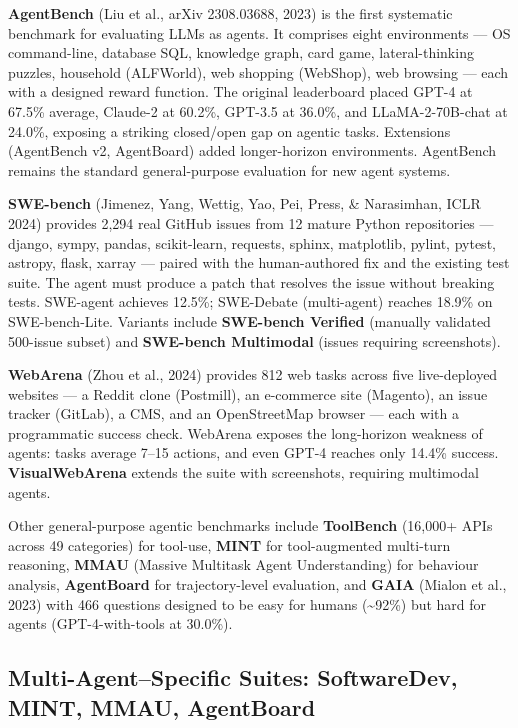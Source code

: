 \textbf{AgentBench} (Liu et al., arXiv 2308.03688, 2023) is the first systematic benchmark for evaluating LLMs as agents. It comprises eight environments --- OS command-line, database SQL, knowledge graph, card game, lateral-thinking puzzles, household (ALFWorld), web shopping (WebShop), web browsing --- each with a designed reward function. The original leaderboard placed GPT-4 at 67.5\% average, Claude-2 at 60.2\%, GPT-3.5 at 36.0\%, and LLaMA-2-70B-chat at 24.0\%, exposing a striking closed/open gap on agentic tasks. Extensions (AgentBench v2, AgentBoard) added longer-horizon environments. AgentBench remains the standard general-purpose evaluation for new agent systems.

\textbf{SWE-bench} (Jimenez, Yang, Wettig, Yao, Pei, Press, \& Narasimhan, ICLR 2024) provides 2,294 real GitHub issues from 12 mature Python repositories --- django, sympy, pandas, scikit-learn, requests, sphinx, matplotlib, pylint, pytest, astropy, flask, xarray --- paired with the human-authored fix and the existing test suite. The agent must produce a patch that resolves the issue without breaking tests. SWE-agent achieves 12.5\%; SWE-Debate (multi-agent) reaches 18.9\% on SWE-bench-Lite. Variants include \textbf{SWE-bench Verified} (manually validated 500-issue subset) and \textbf{SWE-bench Multimodal} (issues requiring screenshots).

\textbf{WebArena} (Zhou et al., 2024) provides 812 web tasks across five live-deployed websites --- a Reddit clone (Postmill), an e-commerce site (Magento), an issue tracker (GitLab), a CMS, and an OpenStreetMap browser --- each with a programmatic success check. WebArena exposes the long-horizon weakness of agents: tasks average 7--15 actions, and even GPT-4 reaches only 14.4\% success. \textbf{VisualWebArena} extends the suite with screenshots, requiring multimodal agents.

Other general-purpose agentic benchmarks include \textbf{ToolBench} (16,000+ APIs across 49 categories) for tool-use, \textbf{MINT} for tool-augmented multi-turn reasoning, \textbf{MMAU} (Massive Multitask Agent Understanding) for behaviour analysis, \textbf{AgentBoard} for trajectory-level evaluation, and \textbf{GAIA} (Mialon et al., 2023) with 466 questions designed to be easy for humans (\textasciitilde92\%) but hard for agents (GPT-4-with-tools at 30.0\%).

\subsection{Multi-Agent--Specific Suites: SoftwareDev, MINT, MMAU, AgentBoard}\label{multi-agentspecific-suites-softwaredev-mint-mmau-agentboard}

